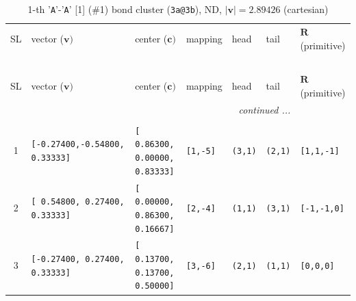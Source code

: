 \documentclass[fleqn,10pt,landscape]{jsarticle}
\begin{document}
\renewcommand{\arraystretch}{1.6}
\begin{longtable}[l]{cllllll}
\captionsetup{justification=raggedright, singlelinecheck=off}
\caption{1-th '\texttt{A}'-'\texttt{A}' [1] (\#1) bond cluster (\texttt{3a@3b}), ND, $|\bm{v}|=2.89426$ (cartesian)}
 \\
 \hline \hline
SL & vector ($\bm{v})$ & center ($\bm{c})$ & mapping & head & tail & $\bm{R}$ (primitive) \\ \hline \endfirsthead

\multicolumn{6}{l}{\tablename\ \thetable{}} \\
 \hline \hline
SL & vector ($\bm{v})$ & center ($\bm{c})$ & mapping & head & tail & $\bm{R}$ (primitive) \\ \hline \endhead

 \hline \hline
\multicolumn{6}{r}{\footnotesize\it continued ...} \\ \endfoot

 \hline \hline
\multicolumn{6}{r}{} \\ \endlastfoot

1 & \texttt{[-0.27400,-0.54800, 0.33333]} & \texttt{[ 0.86300, 0.00000, 0.83333]} & \texttt{[1,-5]} & \texttt{(3,1)} & \texttt{(2,1)} & \texttt{[1,1,-1]} \\ \hline
2 & \texttt{[ 0.54800, 0.27400, 0.33333]} & \texttt{[ 0.00000, 0.86300, 0.16667]} & \texttt{[2,-4]} & \texttt{(1,1)} & \texttt{(3,1)} & \texttt{[-1,-1,0]} \\ \hline
3 & \texttt{[-0.27400, 0.27400, 0.33333]} & \texttt{[ 0.13700, 0.13700, 0.50000]} & \texttt{[3,-6]} & \texttt{(2,1)} & \texttt{(1,1)} & \texttt{[0,0,0]} \\
\end{longtable}
\end{document}
